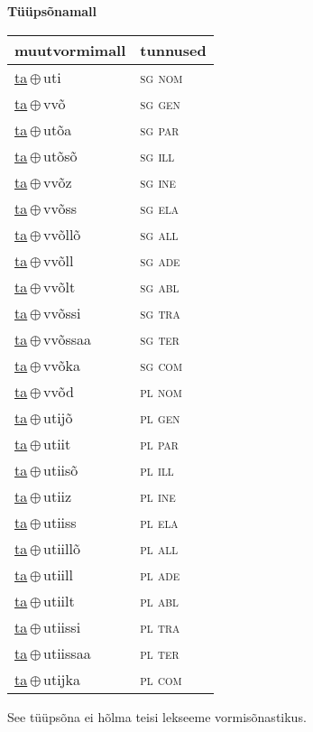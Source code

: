 

\vspace{3.5em}
\noindent \begin{minipage}{\textwidth}
\noindent \textbf{Tüüpsõnamall \,}\\

\begin{sideways}
\begin{tabular}{l l}
muutvormimall & tunnused \\
\hline
\underline{ta}\,$\oplus$\,uti & \textsc{ sg nom } \\
\underline{ta}\,$\oplus$\,vvõ & \textsc{ sg gen } \\
\underline{ta}\,$\oplus$\,utõa & \textsc{ sg par } \\
\underline{ta}\,$\oplus$\,utõsõ & \textsc{ sg ill } \\
\underline{ta}\,$\oplus$\,vvõz & \textsc{ sg ine } \\
\underline{ta}\,$\oplus$\,vvõss & \textsc{ sg ela } \\
\underline{ta}\,$\oplus$\,vvõllõ & \textsc{ sg all } \\
\underline{ta}\,$\oplus$\,vvõll & \textsc{ sg ade } \\
\underline{ta}\,$\oplus$\,vvõlt & \textsc{ sg abl } \\
\underline{ta}\,$\oplus$\,vvõssi & \textsc{ sg tra } \\
\underline{ta}\,$\oplus$\,vvõssaa & \textsc{ sg ter } \\
\underline{ta}\,$\oplus$\,vvõka & \textsc{ sg com } \\
\underline{ta}\,$\oplus$\,vvõd & \textsc{ pl nom } \\
\underline{ta}\,$\oplus$\,utijõ & \textsc{ pl gen } \\
\underline{ta}\,$\oplus$\,utiit & \textsc{ pl par } \\
\underline{ta}\,$\oplus$\,utiisõ & \textsc{ pl ill } \\
\underline{ta}\,$\oplus$\,utiiz & \textsc{ pl ine } \\
\underline{ta}\,$\oplus$\,utiiss & \textsc{ pl ela } \\
\underline{ta}\,$\oplus$\,utiillõ & \textsc{ pl all } \\
\underline{ta}\,$\oplus$\,utiill & \textsc{ pl ade } \\
\underline{ta}\,$\oplus$\,utiilt & \textsc{ pl abl } \\
\underline{ta}\,$\oplus$\,utiissi & \textsc{ pl tra } \\
\underline{ta}\,$\oplus$\,utiissaa & \textsc{ pl ter } \\
\underline{ta}\,$\oplus$\,utijka & \textsc{ pl com } \\
\end{tabular}
\end{sideways}
\label{tab:tüüpsõnamall-tauti}

\end{minipage}

 
\vspace{1em}
\noindent See tüüpsõna ei hõlma teisi lekseeme vormi\-sõnastikus.
